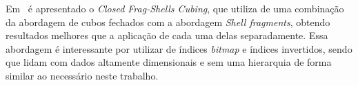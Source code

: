 Em~\cite{zhaoClosedFragShellsCubing2018} é apresentado o \textit{Closed Frag-Shells Cubing}, que utiliza de uma combinação da abordagem de cubos fechados com a abordagem \textit{Shell fragments}, obtendo resultados melhores que a aplicação de cada uma delas separadamente.
Essa abordagem é interessante por utilizar de índices \textit{bitmap} e índices invertidos, sendo que lidam com dados altamente dimensionais e sem uma hierarquia de forma similar ao necessário neste trabalho.

